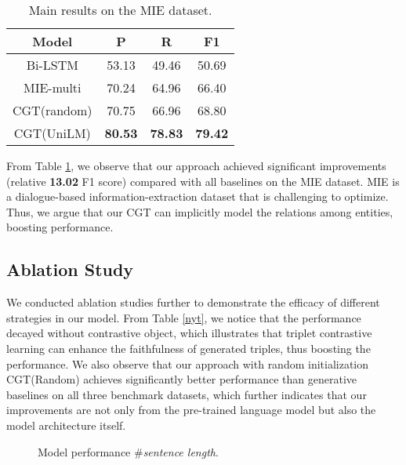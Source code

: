 \documentclass[letterpaper]{article} \usepackage{aaai21}  \usepackage{times}  \usepackage{helvet} \usepackage{courier}  \usepackage[hyphens]{url}  \usepackage{graphicx} \urlstyle{rm} \def\UrlFont{\rm}  \usepackage{natbib}  \usepackage[noend]{algpseudocode}
\begin{document}
 \begin{table}[!htbp]
\centering
\begin{tabular}{c|ccc}
\toprule
Model& P&R&F1 \\
\midrule
Bi-LSTM &53.13 &49.46& 50.69 \\
 MIE-multi &70.24 & 64.96 & 66.40 \\
 \midrule
 CGT(random)&70.75  &66.96  &68.80 \\
 CGT(UniLM)& \textbf{80.53}&\textbf{78.83} &\textbf{79.42} \\
\bottomrule
\end{tabular}
\caption{Main results on the MIE dataset. }
  \label{mie}
\end{table}

From Table \ref{mie}, we observe that our approach achieved significant improvements (relative \textbf{13.02} F1 score) compared with all baselines on the MIE dataset. MIE is a dialogue-based information-extraction dataset that is challenging to optimize. Thus, we argue that our CGT can implicitly model the relations among entities, boosting performance. 

\subsection{Ablation Study}

We conducted ablation studies further to demonstrate the efficacy of different strategies in our model. From Table \ref{nyt}, we notice that the performance decayed without contrastive object, which illustrates that triplet contrastive learning can enhance the faithfulness of generated triples, thus boosting the performance. We also observe that our approach with random initialization CGT(Random) achieves significantly better performance than generative baselines on all three benchmark datasets, which further indicates that our improvements are not only from the pre-trained language model but also the model architecture itself. 

\begin{figure*}[!htbp]
\centering
{}
\caption{Model performance \#\emph{sentence length}.}
\label{len}
\end{figure*}
\end{document}
